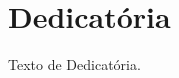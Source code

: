 
\chapter*{Dedicatória}
{\setlength{\parindent}{0cm}

Texto de Dedicatória.

}
\thispagestyle{empty}